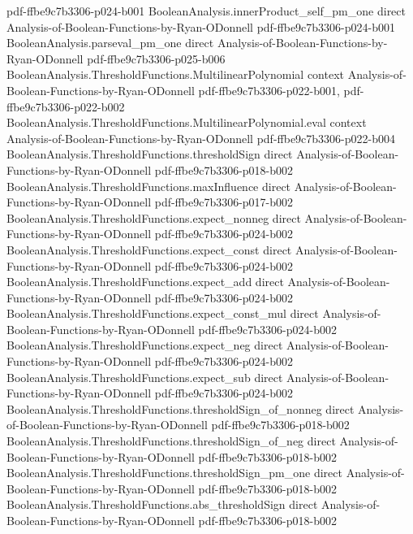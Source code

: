 \begin{lemma}
  {pdf-ffbe9c7b3306-p024-b001}
\proofstep
  {BooleanAnalysis.innerProduct_self_pm_one}
  {direct}
  {Analysis-of-Boolean-Functions-by-Ryan-ODonnell}
  {pdf-ffbe9c7b3306-p024-b001}
\proofstep
  {BooleanAnalysis.parseval_pm_one}
  {direct}
  {Analysis-of-Boolean-Functions-by-Ryan-ODonnell}
  {pdf-ffbe9c7b3306-p025-b006}
\proofstep
  {BooleanAnalysis.ThresholdFunctions.MultilinearPolynomial}
  {context}
  {Analysis-of-Boolean-Functions-by-Ryan-ODonnell}
  {pdf-ffbe9c7b3306-p022-b001,
    pdf-ffbe9c7b3306-p022-b002}
\proofstep
  {BooleanAnalysis.ThresholdFunctions.MultilinearPolynomial.eval}
  {context}
  {Analysis-of-Boolean-Functions-by-Ryan-ODonnell}
  {pdf-ffbe9c7b3306-p022-b004}
\proofstep
  {BooleanAnalysis.ThresholdFunctions.thresholdSign}
  {direct}
  {Analysis-of-Boolean-Functions-by-Ryan-ODonnell}
  {pdf-ffbe9c7b3306-p018-b002}
\proofstep
  {BooleanAnalysis.ThresholdFunctions.maxInfluence}
  {direct}
  {Analysis-of-Boolean-Functions-by-Ryan-ODonnell}
  {pdf-ffbe9c7b3306-p017-b002}
\proofstep
  {BooleanAnalysis.ThresholdFunctions.expect_nonneg}
  {direct}
  {Analysis-of-Boolean-Functions-by-Ryan-ODonnell}
  {pdf-ffbe9c7b3306-p024-b002}
\proofstep
  {BooleanAnalysis.ThresholdFunctions.expect_const}
  {direct}
  {Analysis-of-Boolean-Functions-by-Ryan-ODonnell}
  {pdf-ffbe9c7b3306-p024-b002}
\proofstep
  {BooleanAnalysis.ThresholdFunctions.expect_add}
  {direct}
  {Analysis-of-Boolean-Functions-by-Ryan-ODonnell}
  {pdf-ffbe9c7b3306-p024-b002}
\proofstep
  {BooleanAnalysis.ThresholdFunctions.expect_const_mul}
  {direct}
  {Analysis-of-Boolean-Functions-by-Ryan-ODonnell}
  {pdf-ffbe9c7b3306-p024-b002}
\proofstep
  {BooleanAnalysis.ThresholdFunctions.expect_neg}
  {direct}
  {Analysis-of-Boolean-Functions-by-Ryan-ODonnell}
  {pdf-ffbe9c7b3306-p024-b002}
\proofstep
  {BooleanAnalysis.ThresholdFunctions.expect_sub}
  {direct}
  {Analysis-of-Boolean-Functions-by-Ryan-ODonnell}
  {pdf-ffbe9c7b3306-p024-b002}
\proofstep
  {BooleanAnalysis.ThresholdFunctions.thresholdSign_of_nonneg}
  {direct}
  {Analysis-of-Boolean-Functions-by-Ryan-ODonnell}
  {pdf-ffbe9c7b3306-p018-b002}
\proofstep
  {BooleanAnalysis.ThresholdFunctions.thresholdSign_of_neg}
  {direct}
  {Analysis-of-Boolean-Functions-by-Ryan-ODonnell}
  {pdf-ffbe9c7b3306-p018-b002}
\proofstep
  {BooleanAnalysis.ThresholdFunctions.thresholdSign_pm_one}
  {direct}
  {Analysis-of-Boolean-Functions-by-Ryan-ODonnell}
  {pdf-ffbe9c7b3306-p018-b002}
\proofstep
  {BooleanAnalysis.ThresholdFunctions.abs_thresholdSign}
  {direct}
  {Analysis-of-Boolean-Functions-by-Ryan-ODonnell}
  {pdf-ffbe9c7b3306-p018-b002}
\proofstep

\end{lemma}
